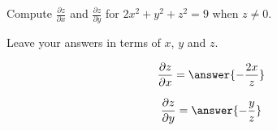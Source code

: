 \documentclass{ximera}
\author{David Guichard \and Neal Koblitz \and H. Jerome Keisler \and Albert Scheller \and Barry Balof \and Mike Wills \and Matthew Carr}
\begin{document}
\begin{exercise}




Compute $\frac{\partial z}{\partial x}$ and $\frac{\partial z}{\partial y}$ for $2x^2+y^2+z^2=9$ when $z\ne 0$.

Leave your answers in terms of $x$, $y$ and $z$.

\begin{prompt}
\[
\frac{\partial z}{\partial x}=\answer{-\frac{2x}{z}}
\]
\end{prompt}

\begin{prompt}
\[
\frac{\partial z}{\partial y}=\answer{-\frac{y}{z}}
\]
\end{prompt}

\end{exercise}
\end{document}
